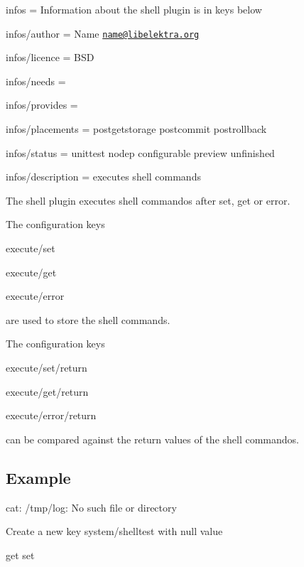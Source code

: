 
\begin{DoxyItemize}
\item infos = Information about the shell plugin is in keys below
\item infos/author = Name \href{mailto:name@libelektra.org}{\tt name@libelektra.\+org}
\item infos/licence = B\+S\+D
\item infos/needs =
\item infos/provides =
\item infos/placements = postgetstorage postcommit postrollback
\item infos/status = unittest nodep configurable preview unfinished
\item infos/description = executes shell commands
\end{DoxyItemize}

The shell plugin executes shell commandos after set, get or error.

The configuration keys


\begin{DoxyItemize}
\item {\ttfamily execute/set}
\item {\ttfamily execute/get}
\item {\ttfamily execute/error}
\end{DoxyItemize}

are used to store the shell commands.

The configuration keys


\begin{DoxyItemize}
\item {\ttfamily execute/set/return}
\item {\ttfamily execute/get/return}
\item {\ttfamily execute/error/return}
\end{DoxyItemize}

can be compared against the return values of the shell commandos.

\subsection*{Example}

\begin{DoxyVerb}%
cat: /tmp/log: No such file or directory


Create a new key system/shelltest with null value

get
set\end{DoxyVerb}
 